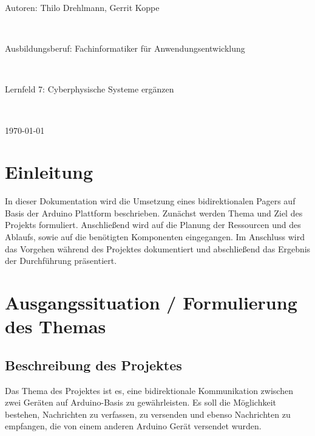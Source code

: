 \documentclass[a4paper, 11pt]{scrartcl}
\begin{document}
\begin{center}
    \begin{Large}
        Autoren: Thilo Drehlmann, Gerrit Koppe
    \end{Large}
    \\
    \vspace{0.5cm}
    \begin{Large}
        Ausbildungsberuf: Fachinformatiker für Anwendungsentwicklung
    \end{Large}
    \\
    \vspace{0.5cm}
    \begin{Large}
        Lernfeld 7: Cyberphysische Systeme ergänzen
    \end{Large}
    \\
    \vspace{0.5cm}
    \begin{Large}
        \today
    \end{Large}
\end{center}
\newpage
\thispagestyle{empty}
\tableofcontents
\newpage
\clearpage
{}
\section{Einleitung}
In dieser Dokumentation wird die Umsetzung eines bidirektionalen Pagers auf Basis der Arduino Plattform beschrieben. Zunächst werden Thema und Ziel des Projekts formuliert.
Anschließend wird auf die Planung der Ressourcen und des Ablaufs, sowie auf die benötigten Komponenten eingegangen. Im Anschluss wird das Vorgehen während des Projektes dokumentiert
und abschließend das Ergebnis der Durchführung präsentiert.

\section{Ausgangssituation / Formulierung des Themas}
\subsection{Beschreibung des Projektes}
Das Thema des Projektes ist es, eine bidirektionale Kommunikation zwischen zwei Geräten auf Arduino-Basis zu gewährleisten. Es soll die Möglichkeit bestehen,
Nachrichten zu verfassen, zu versenden und ebenso Nachrichten zu empfangen, die von einem anderen Arduino Gerät versendet wurden.
\end{document}
